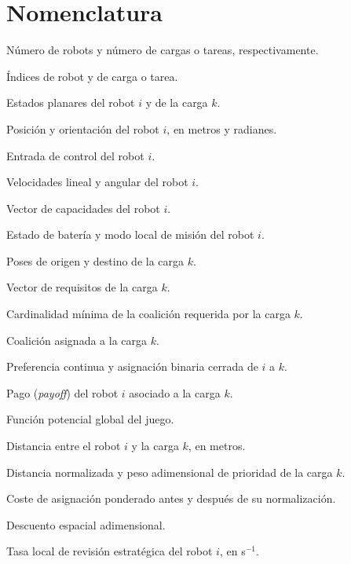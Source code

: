 \clearpage
{}
{}
\section*{Nomenclatura}

\begin{description}[style=multiline,leftmargin=8.2em,labelwidth=7.2em,itemsep=0.15em,parsep=0pt]
  \item[$N, K$] Número de robots y número de cargas o tareas, respectivamente.
  \item[$i, k$] Índices de robot y de carga o tarea.
  \item[$q_i,q_k^L$] Estados planares del robot $i$ y de la carga $k$.
  \item[$p_i,\theta_i$] Posición y orientación del robot $i$, en metros y radianes.
  \item[$u_i$] Entrada de control del robot $i$.
  \item[$v_i,\omega_i$] Velocidades lineal y angular del robot $i$.
  \item[$c_i$] Vector de capacidades del robot $i$.
  \item[$b_i,\sigma_i$] Estado de batería y modo local de misión del robot $i$.
  \item[$l_k,d_k$] Poses de origen y destino de la carga $k$.
  \item[$r_k$] Vector de requisitos de la carga $k$.
  \item[$n_k$] Cardinalidad mínima de la coalición requerida por la carga $k$.
  \item[$C_k$] Coalición asignada a la carga $k$.
  \item[$\rho_{ik},x_{ik}$] Preferencia continua y asignación binaria cerrada de $i$ a $k$.
  \item[$f_{ik}$] Pago (\emph{payoff}) del robot $i$ asociado a la carga $k$.
  \item[$\Phi$] Función potencial global del juego.
  \item[$\delta_{ik}$] Distancia entre el robot $i$ y la carga $k$, en metros.
  \item[$\bar\delta_{ik},w_k$] Distancia normalizada y peso adimensional de prioridad de la carga $k$.
  \item[$\widetilde\kappa_{ik},\kappa_{ik}$] Coste de asignación ponderado antes y después de su normalización.
  \item[$\Psi(\delta_{ik})$] Descuento espacial adimensional.
  \item[$\mu_i(t)$] Tasa local de revisión estratégica del robot $i$, en s$^{-1}$.

\end{description}
